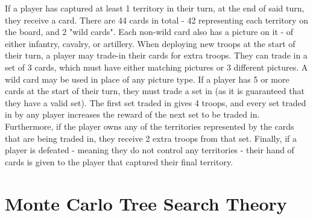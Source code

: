 If a player has captured at least 1 territory in their turn, at the end of said turn, they receive a card. There are 44 cards in total - 42 representing each territory on the board, and 2 "wild cards". Each non-wild card also has a picture on it - of either infantry, cavalry, or artillery. When deploying new troops at the start of their turn, a player may trade-in their cards for extra troops. They can trade in a set of 3 cards, which must have either matching pictures or 3 different pictures. A wild card may be used in place of any picture type. If a player has 5 or more cards at the start of their turn, they must trade a set in (as it is guaranteed that they have a valid set). The first set traded in gives 4 troops, and every set traded in by any player increases the reward of the next set to be traded in. Furthermore, if the player owns any of the territories represented by the cards that are being traded in, they receive 2 extra troops from that set. Finally, if a player is defeated - meaning they do not control any territories - their hand of cards is given to the player that captured their final territory.

\section{Monte Carlo Tree Search Theory}
\label{MCTSTheory}

